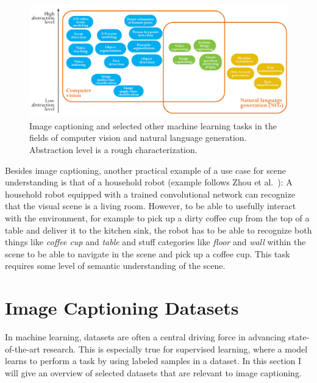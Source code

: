 \documentclass[english,twoside,openright]{HYgraduMLDS}
\begin{document}
\begin{figure}[h] 
\centering
\includegraphics[width=1.0\textwidth]{./images-indesign/Task_map.png}
\caption{Image captioning and selected other machine learning tasks in the fields of computer vision and natural language generation. Abstraction level is a rough characterization.}
\label{fig:Task_map} 
\end{figure}

Besides image captioning, another practical example of a use case for scene understanding is that of a household robot (example follows Zhou et al.~\cite{zhou2017scene}): A household robot equipped with a trained convolutional network can recognize that the visual scene is a living room. However, to be able to usefully interact with the environment, for example to pick up a dirty coffee cup from the top of a table and deliver it to the kitchen sink, the robot has to be able to recognize both things like \textit{coffee cup} and \textit{table} and stuff categories like \textit{floor} and \textit{wall} within the scene to be able to navigate in the scene and pick up a coffee cup. This task requires some level of semantic understanding of the scene.

\section{Image Captioning Datasets}
\label{section:imagecaptioningdatasets}
In machine learning, datasets are often a central driving force in advancing state-of-the-art research. This is especially true for supervised learning, where a model learns to perform a task by using labeled samples in a dataset. In this section I will give an overview of selected datasets that are relevant to image captioning.
\end{document}
